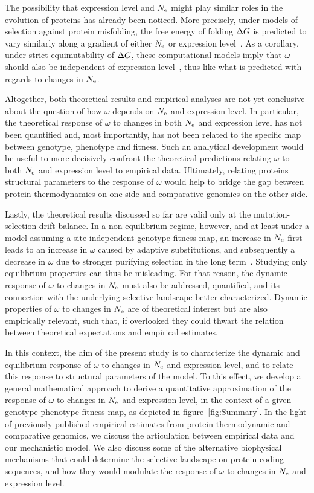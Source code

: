 The possibility that expression level and $N_{\text{e}}$ might play similar roles in the evolution of proteins has already been noticed.
More precisely, under models of selection against protein misfolding, the free energy of folding $\Delta G$ is predicted to vary similarly along a gradient of either $N_{\text{e}}$ or expression level~\citep{Serohijos2013}.
As a corollary, under strict equimutability of $\Delta G$, these computational models imply that $\omega$ should also be independent of expression level~\citep{Serohijos2012}, thus like what is predicted with regards to changes in $N_{\text{e}}$.

Altogether, both theoretical results and empirical analyses are not yet conclusive about the question of how $\omega$ depends on $N_{\text{e}}$ and expression level.
In particular, the theoretical response of $\omega$ to changes in both $N_{\text{e}}$ and expression level has not been quantified and, most importantly, has not been related to the specific map between genotype, phenotype and fitness.
Such an analytical development would be useful to more decisively confront the theoretical predictions relating $\omega$ to both $N_{\text{e}}$ and expression level to empirical data.
Ultimately, relating proteins structural parameters to the response of $\omega$ would help to bridge the gap between protein thermodynamics on one side and comparative genomics on the other side.

Lastly, the theoretical results discussed so far are valid only at the mutation-selection-drift balance.
In a non-equilibrium regime, however, and at least under a model assuming a site-independent genotype-fitness map, an increase in $N_{\text{e}}$ first leads to an increase in $\omega$ caused by adaptive substitutions, and subsequently a decrease in $\omega$ due to stronger purifying selection in the long term~\citep{Jones2016}.
Studying only equilibrium properties can thus be misleading.
For that reason, the dynamic response of $\omega$ to changes in $N_{\text{e}}$ must also be addressed, quantified, and its connection with the underlying selective landscape better characterized.
Dynamic properties of $\omega$ to changes in $N_{\text{e}}$ are of theoretical interest but are also empirically relevant, such that, if overlooked they could thwart the relation between theoretical expectations and empirical estimates.

In this context, the aim of the present study is to characterize the dynamic and equilibrium response of $\omega$ to changes in $N_{\text{e}}$ and expression level, and to relate this response to structural parameters of the model.
To this effect, we develop a general mathematical approach to derive a quantitative approximation of the response of $\omega$ to changes in $N_{\text{e}}$ and expression level, in the context of a given genotype-phenotype-fitness map, as depicted in figure~\ref{fig:Summary}.
In the light of previously published empirical estimates from protein thermodynamic and comparative genomics, we discuss the articulation between empirical data and our mechanistic model.
We also discuss some of the alternative biophysical mechanisms that could determine the selective landscape on protein-coding sequences, and how they would modulate the response of $\omega$ to changes in $N_{\text{e}}$ and expression level.


